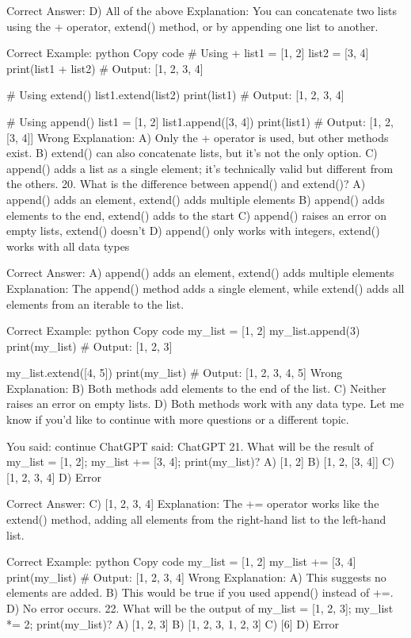 Correct Answer: D) All of the above
Explanation: You can concatenate two lists using the + operator, extend() method, or by appending one list to another.

Correct Example:
python
Copy code
# Using +
list1 = [1, 2]
list2 = [3, 4]
print(list1 + list2)  # Output: [1, 2, 3, 4]

# Using extend()
list1.extend(list2)
print(list1)  # Output: [1, 2, 3, 4]

# Using append()
list1 = [1, 2]
list1.append([3, 4])
print(list1)  # Output: [1, 2, [3, 4]]
Wrong Explanation:
A) Only the + operator is used, but other methods exist.
B) extend() can also concatenate lists, but it's not the only option.
C) append() adds a list as a single element; it's technically valid but different from the others.
20. What is the difference between append() and extend()?
A) append() adds an element, extend() adds multiple elements
B) append() adds elements to the end, extend() adds to the start
C) append() raises an error on empty lists, extend() doesn't
D) append() only works with integers, extend() works with all data types

Correct Answer: A) append() adds an element, extend() adds multiple elements
Explanation: The append() method adds a single element, while extend() adds all elements from an iterable to the list.

Correct Example:
python
Copy code
my_list = [1, 2]
my_list.append(3)
print(my_list)  # Output: [1, 2, 3]

my_list.extend([4, 5])
print(my_list)  # Output: [1, 2, 3, 4, 5]
Wrong Explanation:
B) Both methods add elements to the end of the list.
C) Neither raises an error on empty lists.
D) Both methods work with any data type.
Let me know if you'd like to continue with more questions or a different topic.






You said:
continue
ChatGPT said:
ChatGPT
21. What will be the result of my_list = [1, 2]; my_list += [3, 4]; print(my_list)?
A) [1, 2]
B) [1, 2, [3, 4]]
C) [1, 2, 3, 4]
D) Error

Correct Answer: C) [1, 2, 3, 4]
Explanation: The += operator works like the extend() method, adding all elements from the right-hand list to the left-hand list.

Correct Example:
python
Copy code
my_list = [1, 2]
my_list += [3, 4]
print(my_list)  # Output: [1, 2, 3, 4]
Wrong Explanation:
A) This suggests no elements are added.
B) This would be true if you used append() instead of +=.
D) No error occurs.
22. What will be the output of my_list = [1, 2, 3]; my_list *= 2; print(my_list)?
A) [1, 2, 3]
B) [1, 2, 3, 1, 2, 3]
C) [6]
D) Error

